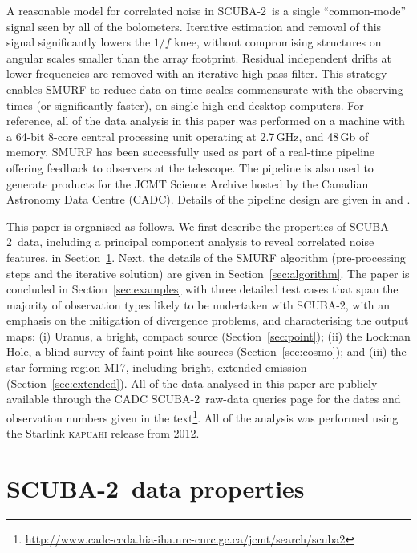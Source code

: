 \documentclass[useAMS,usenatbib,nofootinbib]{mn2e}
\newcommand{\scuba}{SCUBA-2}
\begin{document}
A reasonable model for correlated noise in \scuba\ is a single
``common-mode'' signal seen by all of the bolometers. Iterative
estimation and removal of this signal significantly lowers the $1/f$
knee, without compromising structures on angular scales smaller than
the array footprint. Residual independent drifts at lower frequencies
are removed with an iterative high-pass filter. This strategy enables
SMURF to reduce data on time scales commensurate with the observing
times (or significantly faster), on single high-end desktop
computers. For reference, all of the data analysis in this paper was
performed on a machine with a 64-bit 8-core central processing unit
operating at 2.7\,GHz, and 48\,Gb of memory. SMURF has been
successfully used as part of a real-time pipeline offering feedback to
observers at the telescope. The pipeline is also used to generate
products for the JCMT Science Archive \citep{2011ASPC..442..203E}
hosted by the Canadian Astronomy Data Centre (CADC). Details of the
pipeline design are given in \citet{gibb2005} and
\citet{2008AN....329..295C}.

This paper is organised as follows. We first describe the properties
of \scuba\ data, including a principal component analysis to reveal
correlated noise features, in Section~\ref{sec:data}. Next, the
details of the SMURF algorithm (pre-processing steps and the iterative
solution) are given in Section~\ref{sec:algorithm}. The paper is
concluded in Section~\ref{sec:examples} with three detailed test cases
that span the majority of observation types likely to be undertaken
with \scuba, with an emphasis on the mitigation of divergence
problems, and characterising the output maps: (i) Uranus, a bright,
compact source (Section~\ref{sec:point}); (ii) the Lockman Hole, a
blind survey of faint point-like sources (Section~\ref{sec:cosmo});
and (iii) the star-forming region M17, including bright, extended
emission (Section~\ref{sec:extended}). All of the data analysed in
this paper are publicly available through the CADC \scuba\ raw-data
queries page for the dates and observation numbers given in the
text\footnote{\url{http://www.cadc-ccda.hia-iha.nrc-cnrc.gc.ca/jcmt/search/scuba2}}.
All of the analysis was performed using the Starlink \textsc{kapuahi}
release from 2012.

\section{\scuba\ data properties}
\label{sec:data}
\end{document}
